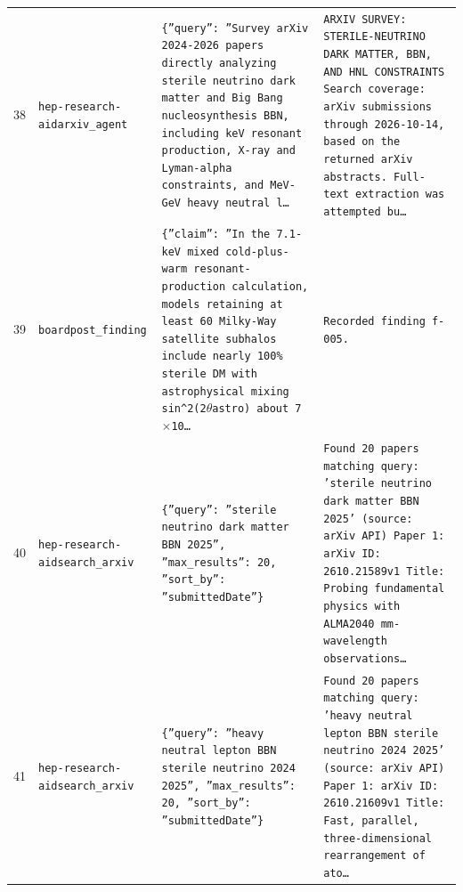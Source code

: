 \documentclass[11pt,a4paper]{article}
\begin{document}
\begin{longtable}{@{}p{}p{}p{}p{}@{}}
38 & \texttt{hep-research-aid}\newline\texttt{arxiv\_\allowbreak{}agent} & \texttt{\{''query'':\allowbreak{} ''Survey arXiv 2024-2026 papers directly analyzing sterile neutrino dark matter and Big Bang nucleosynthesis BBN,\allowbreak{} including keV resonant production,\allowbreak{} X-ray and Lyman-alpha constraints,\allowbreak{} and MeV-GeV heavy neutral l\ldots{}\allowbreak{}} & \texttt{ARXIV SURVEY:\allowbreak{} STERILE-NEUTRINO DARK MATTER,\allowbreak{} BBN,\allowbreak{} AND HNL CONSTRAINTS Search coverage:\allowbreak{} arXiv submissions through 2026-10-14,\allowbreak{} based on the returned arXiv abstracts. Full-text extraction was attempted bu\ldots{}\allowbreak{}} \\
39 & \texttt{board}\newline\texttt{post\_\allowbreak{}finding} & \texttt{\{''claim'':\allowbreak{} ''In the 7.1-keV mixed cold-plus-warm resonant-production calculation,\allowbreak{} models retaining at least 60 Milky-Way satellite subhalos include nearly 100\% sterile DM with astrophysical mixing sin\textasciicircum{}\allowbreak{}2(2$\theta$astro)\allowbreak{} about 7$\times$10\ldots{}\allowbreak{}} & \texttt{Recorded finding f-005.} \\
40 & \texttt{hep-research-aid}\newline\texttt{search\_\allowbreak{}arxiv} & \texttt{\{''query'':\allowbreak{} ''sterile neutrino dark matter BBN 2025'',\allowbreak{} ''max\_\allowbreak{}results'':\allowbreak{} 20,\allowbreak{} ''sort\_\allowbreak{}by'':\allowbreak{} ''submittedDate''\}\allowbreak{}} & \texttt{Found 20 papers matching query:\allowbreak{} 'sterile neutrino dark matter BBN 2025' (source:\allowbreak{} arXiv API)\allowbreak{}  Paper 1:\allowbreak{} arXiv ID:\allowbreak{} 2610.21589v1 Title:\allowbreak{} Probing fundamental physics with ALMA2040 mm-wavelength observations\ldots{}\allowbreak{}} \\
41 & \texttt{hep-research-aid}\newline\texttt{search\_\allowbreak{}arxiv} & \texttt{\{''query'':\allowbreak{} ''heavy neutral lepton BBN sterile neutrino 2024 2025'',\allowbreak{} ''max\_\allowbreak{}results'':\allowbreak{} 20,\allowbreak{} ''sort\_\allowbreak{}by'':\allowbreak{} ''submittedDate''\}\allowbreak{}} & \texttt{Found 20 papers matching query:\allowbreak{} 'heavy neutral lepton BBN sterile neutrino 2024 2025' (source:\allowbreak{} arXiv API)\allowbreak{}  Paper 1:\allowbreak{} arXiv ID:\allowbreak{} 2610.21609v1 Title:\allowbreak{} Fast,\allowbreak{} parallel,\allowbreak{} three-dimensional rearrangement of ato\ldots{}\allowbreak{}} \\

\end{longtable}
\end{document}
